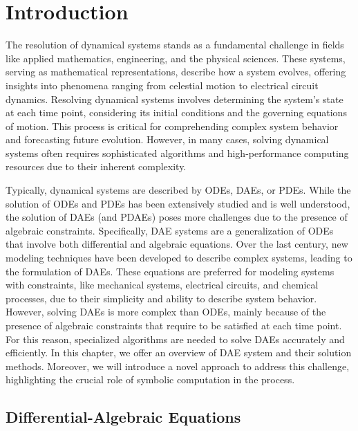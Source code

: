
\chapter{Introduction}
\label{chap1:introduction}

The resolution of dynamical systems stands as a fundamental challenge in fields like applied mathematics, engineering, and the physical sciences. These systems, serving as mathematical representations, describe how a system evolves, offering insights into phenomena ranging from celestial motion to electrical circuit dynamics. Resolving dynamical systems involves determining the system's state at each time point, considering its initial conditions and the governing equations of motion. This process is critical for comprehending complex system behavior and forecasting future evolution. However, in many cases, solving dynamical systems often requires sophisticated algorithms and high-performance computing resources due to their inherent complexity.


Typically, dynamical systems are described by \acp{ODE}, \acp{DAE}, or \acp{PDE}. While the solution of \acp{ODE} and \acp{PDE} has been extensively studied and is well understood, the solution of \acp{DAE} (and \acp{PDAE}) poses more challenges due to the presence of algebraic constraints. Specifically, \ac{DAE} systems are a generalization of \acp{ODE} that involve both differential and algebraic equations. Over the last century, new modeling techniques have been developed to describe complex systems, leading to the formulation of \acp{DAE}. These equations are preferred for modeling systems with constraints, like mechanical systems, electrical circuits, and chemical processes, due to their simplicity and ability to describe system behavior. However, solving \acp{DAE} is more complex than \acp{ODE}, mainly because of the presence of algebraic constraints that require to be satisfied at each time point. For this reason, specialized algorithms are needed to solve \acp{DAE} accurately and efficiently. In this chapter, we offer an overview of \ac{DAE} system and their solution methods. Moreover, we will introduce a novel approach to address this challenge, highlighting the crucial role of symbolic computation in the process.


\section{Differential-Algebraic Equations}


